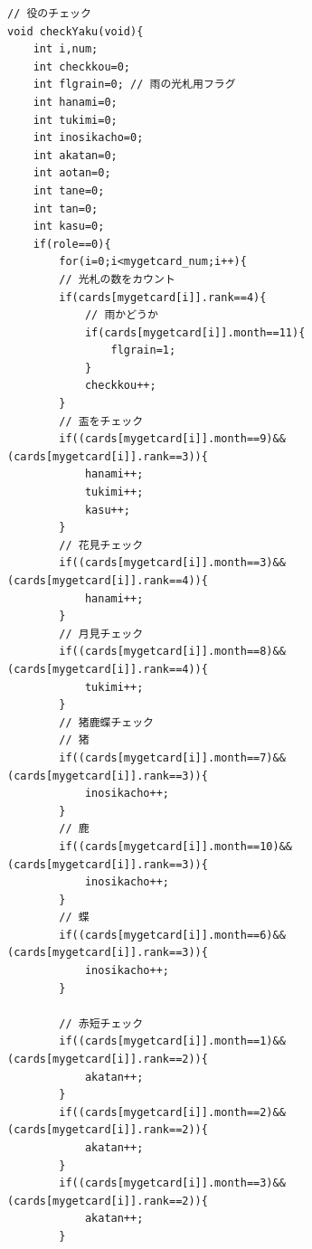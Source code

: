 \documentclass[a4j]{jarticle}
\begin{document}
    \begin{lstlisting}[basicstyle=\ttfamily\footnotesize, frame=single,label=yaku,caption=役の処理]
// 役のチェック
void checkYaku(void){
    int i,num;
    int checkkou=0;
    int flgrain=0; // 雨の光札用フラグ
    int hanami=0;
    int tukimi=0;
    int inosikacho=0;
    int akatan=0;
    int aotan=0;
    int tane=0;
    int tan=0;
    int kasu=0;
    if(role==0){
        for(i=0;i<mygetcard_num;i++){
        // 光札の数をカウント
        if(cards[mygetcard[i]].rank==4){
            // 雨かどうか
            if(cards[mygetcard[i]].month==11){
                flgrain=1;
            }
            checkkou++;
        }
        // 盃をチェック
        if((cards[mygetcard[i]].month==9)&&(cards[mygetcard[i]].rank==3)){
            hanami++;
            tukimi++;
            kasu++;
        }
        // 花見チェック
        if((cards[mygetcard[i]].month==3)&&(cards[mygetcard[i]].rank==4)){
            hanami++;
        }
        // 月見チェック
        if((cards[mygetcard[i]].month==8)&&(cards[mygetcard[i]].rank==4)){
            tukimi++;
        }
        // 猪鹿蝶チェック
        // 猪
        if((cards[mygetcard[i]].month==7)&&(cards[mygetcard[i]].rank==3)){
            inosikacho++;
        }
        // 鹿
        if((cards[mygetcard[i]].month==10)&&(cards[mygetcard[i]].rank==3)){
            inosikacho++;
        }
        // 蝶
        if((cards[mygetcard[i]].month==6)&&(cards[mygetcard[i]].rank==3)){
            inosikacho++;
        }

        // 赤短チェック
        if((cards[mygetcard[i]].month==1)&&(cards[mygetcard[i]].rank==2)){
            akatan++;
        }
        if((cards[mygetcard[i]].month==2)&&(cards[mygetcard[i]].rank==2)){
            akatan++;
        }
        if((cards[mygetcard[i]].month==3)&&(cards[mygetcard[i]].rank==2)){
            akatan++;
        }


\end{lstlisting}
\end{document}
